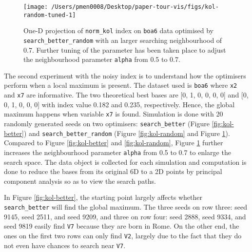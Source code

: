 \documentclass[12pt]{article}
\begin{document}
\begin{figure}

{\centering \texttt{[image: /Users/pmen0008/Desktop/paper-tour-vis/figs/kol-random-tuned-1]} 

}

\caption{One-D projection of \texttt{norm\_kol} index on \texttt{boa6} data optimised by \texttt{search\_better\_random} with an larger searching neighbourhood of 0.7. Further tuning of the parameter has been taken place to adjust the neighbourhood parameter \texttt{alpha} from 0.5 to 0.7.}\label{fig:kol-random-tuned}
\end{figure}



The second experiment with the noisy index is to understand how the optimisers perform when a local maximum is present. The dataset used is \texttt{boa6} where \texttt{x2} and \texttt{x7} are informative. The two theoretical best bases are {[}0, 1, 0, 0, 0, 0{]} and {[}0, 0, 1, 0, 0, 0{]} with index value 0.182 and 0.235, respectively. Hence, the global maximum happens when variable \texttt{x7} is found. Simulation is done with 20 randomly generated seeds on two optimisers: \texttt{search\_better} (Figure \ref{fig:kol-better}) and \texttt{search\_better\_random} (Figure \ref{fig:kol-random} and Figure \ref{fig:kol-random-tuned}). Compared to Figure \ref{fig:kol-better} and \ref{fig:kol-random}, Figure \ref{fig:kol-random-tuned} further increases the neighbourhood parameter \texttt{alpha} from 0.5 to 0.7 to enlarge the search space. The data object is collected for each simulation and computation is done to reduce the bases from its original 6D to a 2D points by principal component analysis so as to view the search paths.

In Figure \ref{fig:kol-better}, the starting point largely affects whether \texttt{search\_better} will find the global maximum. The three seeds on row three: seed 9145, seed 2511, and seed 9209, and three on row four: seed 2888, seed 9334, and seed 9819 easily find \texttt{V7} because they are born in Rome. On the other end, the ones on the first two rows can only find \texttt{V2}, largely due to the fact that they do not even have chances to search near \texttt{V7}.
\end{document}
